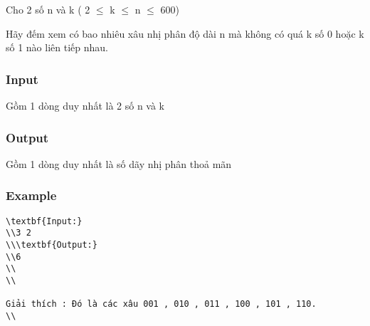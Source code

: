 



   Cho 2 số n và k ( 2 $\le$ k  $\le$  n  $\le$  600)  

   Hãy đếm xem có bao nhiêu xâu nhị phân độ dài n mà không có quá k số 0 hoặc k số 1 nào liên tiếp nhau.  

\subsubsection{   Input  }

   Gồm 1 dòng duy nhất là 2 số n và k  

\subsubsection{   Output  }

   Gồm 1 dòng duy nhất là số dãy nhị phân thoả mãn  

\subsubsection{   Example  }
\begin{verbatim}
\textbf{Input:}
\\3 2
\\\textbf{Output:}
\\6
\\
\\

Giải thích : Đó là các xâu 001 , 010 , 011 , 100 , 101 , 110.
\\\end{verbatim}
